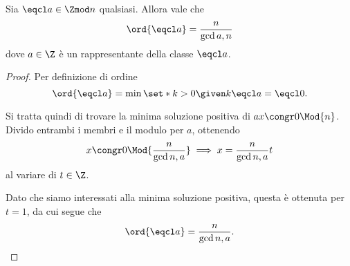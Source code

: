 \begin{proposition}
     \label{prop:ord_in_Z/nZ}
    Sia $\eqcl a \in \Zmod n$ qualsiasi. Allora vale che \[
        \ord{\eqcl a} = \frac{n}{\gcd{a, n}}    
    \] dove $a \in \Z$ è un rappresentante della classe $\eqcl a$.
\end{proposition}
\begin{proof}
    Per definizione di ordine \[
        \ord{\eqcl a} = \min \set*{k > 0 \given k \eqcl a = \eqcl 0}.    
    \]

    Si tratta quindi di trovare la minima soluzione positiva di $ax \congr 0 \Mod{n}$. Divido entrambi i membri e il modulo per $a$, ottenendo \[
        x \congr 0 \Mod{\frac{n}{\gcd{n, a}}} \implies x = \frac{n}{\gcd{n, a}}t    
    \] al variare di $t \in \Z$. 

    Dato che siamo interessati alla minima soluzione positiva, questa è ottenuta per $t = 1$, da cui segue che \[
        \ord{\eqcl a} = \frac{n}{\gcd{n, a}}. \qedhere    
    \]
\end{proof}

